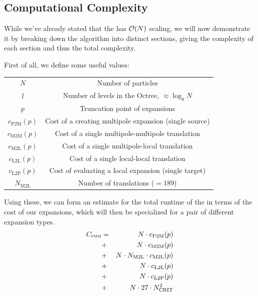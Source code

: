 \subsection{Computational Complexity}

While we've already stated that the {\fmm} has $\mathcal{O}(N)$ scaling, we will now demonstrate it by breaking down the algorithm into distinct sections, giving the complexity of each section and thus the total complexity.

First of all, we define some useful values:

\begin{center}
\begin{tabular}{c|c}
	$N$ & Number of particles \\
	$l$ & Number of levels in the Octree, $\approx \log_8N$ \\
	$p$ & Truncation point of expansions \\
	$c_{\text{P2M}}(p)$ & Cost of a creating multipole expansion (single source) \\
	$c_{\text{M2M}}(p)$ & Cost of a single multipole-multipole translation \\
	$c_{\text{M2L}}(p)$ & Cost of a single multipole-local translation \\
	$c_{\text{L2L}}(p)$ & Cost of a single local-local translation \\
	$c_{\text{L2P}}(p)$ & Cost of evaluating a local expansion (single target) \\
	$N_{\text{M2L}}$ & Number of {\mtol} translations ($=189$)
\end{tabular}
\end{center}

Using these, we can form an estimate for the total runtime of the {\fmm} in terms of the cost of our expansions, which will then be specialized for a pair of different expansion types.
\begin{eqnarray}
	C_{\text{\fmm}} & = & N\cdot c_{\text{P2M}}(p) \nonumber \\
	& + & N\cdot c_{\text{M2M}}(p) \nonumber \\
 	& + & N\cdot N_{\text{M2L}}\cdot c_{\text{M2L}}(p) \label{eqn:fmm_costs} \\
	& + & N\cdot c_{\text{L2L}}(p) \nonumber \\
	& + & N\cdot c_{\text{L2P}}(p) \nonumber \\
	& + & N\cdot 27\cdot N_{\text{CRIT}}^{2} \nonumber
\end{eqnarray}

